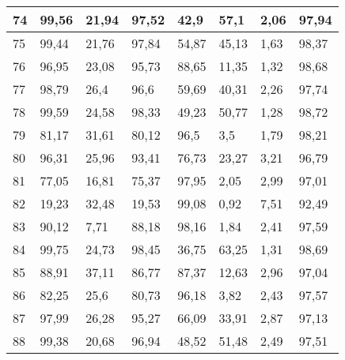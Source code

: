 \begin{longtable}[c]{|l|l|l|l|l|l|l|l|}
74              & 99,56        & 21,94        & 97,52       & 42,9          & 57,1          & 2,06          & 97,94         \\ \hline
75              & 99,44        & 21,76        & 97,84       & 54,87         & 45,13         & 1,63          & 98,37         \\ \hline
76              & 96,95        & 23,08        & 95,73       & 88,65         & 11,35         & 1,32          & 98,68         \\ \hline
77              & 98,79        & 26,4         & 96,6        & 59,69         & 40,31         & 2,26          & 97,74         \\ \hline
78              & 99,59        & 24,58        & 98,33       & 49,23         & 50,77         & 1,28          & 98,72         \\ \hline
79              & 81,17        & 31,61        & 80,12       & 96,5          & 3,5           & 1,79          & 98,21         \\ \hline
80              & 96,31        & 25,96        & 93,41       & 76,73         & 23,27         & 3,21          & 96,79         \\ \hline
81              & 77,05        & 16,81        & 75,37       & 97,95         & 2,05          & 2,99          & 97,01         \\ \hline
82              & 19,23        & 32,48        & 19,53       & 99,08         & 0,92          & 7,51          & 92,49         \\ \hline
83              & 90,12        & 7,71         & 88,18       & 98,16         & 1,84          & 2,41          & 97,59         \\ \hline
84              & 99,75        & 24,73        & 98,45       & 36,75         & 63,25         & 1,31          & 98,69         \\ \hline
85              & 88,91        & 37,11        & 86,77       & 87,37         & 12,63         & 2,96          & 97,04         \\ \hline
86              & 82,25        & 25,6         & 80,73       & 96,18         & 3,82          & 2,43          & 97,57         \\ \hline
87              & 97,99        & 26,28        & 95,27       & 66,09         & 33,91         & 2,87          & 97,13         \\ \hline
88              & 99,38        & 20,68        & 96,94       & 48,52         & 51,48         & 2,49          & 97,51         \\ \hline

\end{longtable}
